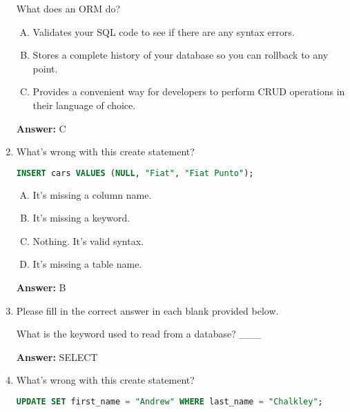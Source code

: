 \documentclass[12pt]{article}
\begin{document}
\begin{enumerate}[1.]
    What does an ORM do?

    \bigskip

    \begin{enumerate}[A.]
        \item Validates your SQL code to see if there are any syntax errors.
        \item Stores a complete history of your database so you can rollback to any point.
        \item Provides a convenient way for developers to perform CRUD operations in their language of choice.
    \end{enumerate}

    \bigskip

    \textbf{Answer:} C

    \item

    What's wrong with this create statement?

    \begin{lstlisting}[language=SQL]
    INSERT cars VALUES (NULL, "Fiat", "Fiat Punto");
    \end{lstlisting}

    \bigskip

    \begin{enumerate}[A.]
        \item It's missing a column name.
        \item It's missing a keyword.
        \item Nothing. It's valid syntax.
        \item It's missing a table name.

    \end{enumerate}

    \bigskip

    \textbf{Answer:} B

    \item

    Please fill in the correct answer in each blank provided below.

    \bigskip

    What is the keyword used to read from a database?  \_\_\_

    \bigskip

    \textbf{Answer:} SELECT

    \item

    What's wrong with this create statement?

    \begin{lstlisting}[language=SQL]
    UPDATE SET first_name = "Andrew" WHERE last_name = "Chalkley";
    \end{lstlisting}


\end{enumerate}
\end{document}
